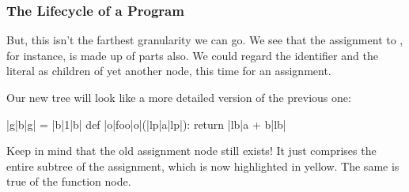 \documentclass[aspectratio=169, handout]{beamer}
\begin{document}
\begin{frame}[fragile]
  \frametitle{The Lifecycle of a Program}

  But, this isn't the farthest granularity we can go. We see that the assignment to
  , for instance, is made up of parts also. We could regard the identifier
   and the literal  as children of yet another node, this time for
  an assignment.

  \vspace{5pt}

  Our new tree will look like a more detailed version of the previous one:

  \vspace{8pt}

  \begin{minipage}[t][1.4in][t]{\textwidth}
    \begin{minipage}{0.3\textwidth}
      \begin{pythoncodeblock}
        |g|b|g| = |b|1|b|
        def |o|foo|o|(|lp|a|lp|):
          return |lb|a + b|lb|
      \end{pythoncodeblock}
    \end{minipage}
    \begin{minipage}{0.65\textwidth}
      \begin{center}
      \end{center}
    \end{minipage}
  \end{minipage}

  \vspace{8pt}

  Keep in mind that the old assignment node still exists! It just comprises the entire
  subtree of the assignment, which is now highlighted in yellow. The same is true of the
  function node.
\end{frame}
\end{document}
